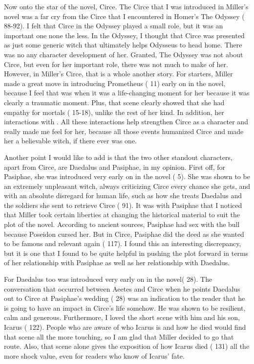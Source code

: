 \documentclass[12pt, a4paper]{article}
\begin{document}
Now onto the star of the novel, Circe. The Circe that I was introduced in Miller's novel was a far cry from the Circe that I encountered in Homer's The Odyssey (\cite{homer_odyssey_1998} 88-92). I felt that Circe in the Odyssey played a small role, but it was an important one none the less. In the Odyssey, I thought that Circe was presented as just some generic witch that ultimately helps Odysseus to head home. There was no any character development of her. Granted, The Odyssey was not about Circe, but even for her important role, there was not much to make of her. However, in Miller's Circe, that is a whole another story. For starters, Miller made a great move in introducing Prometheus (\cite{miller_circe_2018} 11) early on in the novel, because I feel that was when it was a life-changing moment for her because it was clearly a traumatic moment. Plus, that scene clearly showed that she had empathy for mortals (\cite{miller_circe_2018} 15-18), unlike the rest of her kind. In addition, her interactions with . All these interactions help strengthen Circe as a character and really made me feel for her, because all those events humanized Circe and made her a believable witch, if there ever was one.

Another point I would like to add is that the two other standout characters, apart from Circe, are Daedalus and Pasiphae, in my opinion. First off, for Pasiphae, she was introduced very early on in the novel (\cite{miller_circe_2018} 5). She was shown to be an extremely unpleasant witch, always criticizing Circe every chance she gets, and with an absolute disregard for human life, such as how she treats Daedalus and the soldiers she sent to retrieve Circe (\cite{miller_circe_2018} 91). It was with Pasiphae that I noticed that Miller took certain liberties at changing the historical material to suit the plot of the novel. According to ancient sources, Pasiphae had sex with the bull because Poseidon cursed her. But in Circe, Pasiphae did the deed as she wanted to be famous and relevant again (\cite{miller_circe_2018} 117). I found this an interesting discrepancy, but it is one that I found to be quite helpful in pushing the plot forward in terms of her relationship with Pasiphae as well as her relationship with Daedalus.

For Daedalus too was introduced very early on in the novel(\cite{miller_circe_2018} 28). The conversation that occurred between Aeetes and Circe when he points Daedalus out to Circe at Pasiphae's wedding (\cite{miller_circe_2018} 28) was an indication to the reader that he is going to have an impact in Circe's life somehow. He was shown to be resilient, calm and generous. Furthermore, I loved the short scene with him and his son, Icarus (\cite{miller_circe_2018} 122). People who are aware of who Icarus is and how he died would find that scene all the more touching, so I am glad that Miller decided to go that route. Also, that scene alone gives the exposition of how Icarus died (\cite{miller_circe_2018} 131) all the more shock value, even for readers who know of Icarus' fate.
\end{document}
